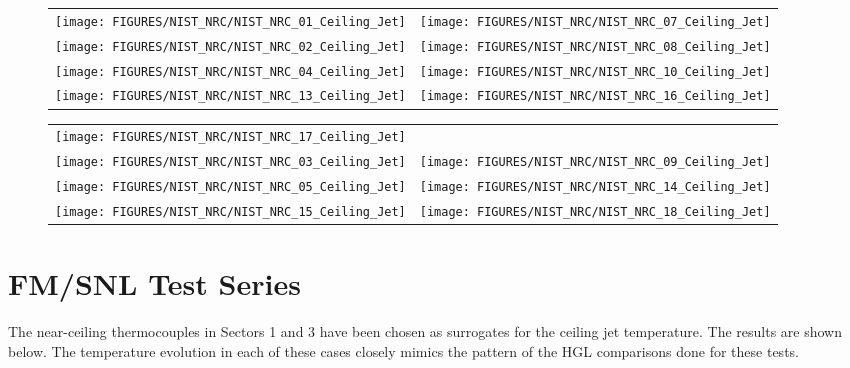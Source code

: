 \begin{figure}[p]
\begin{tabular*}{\textwidth}{l@{\extracolsep{\fill}}r}
\texttt{[image: FIGURES/NIST\_NRC/NIST\_NRC\_01\_Ceiling\_Jet]} &
\texttt{[image: FIGURES/NIST\_NRC/NIST\_NRC\_07\_Ceiling\_Jet]} \\
\texttt{[image: FIGURES/NIST\_NRC/NIST\_NRC\_02\_Ceiling\_Jet]} &
\texttt{[image: FIGURES/NIST\_NRC/NIST\_NRC\_08\_Ceiling\_Jet]} \\
\texttt{[image: FIGURES/NIST\_NRC/NIST\_NRC\_04\_Ceiling\_Jet]} &
\texttt{[image: FIGURES/NIST\_NRC/NIST\_NRC\_10\_Ceiling\_Jet]} \\
\texttt{[image: FIGURES/NIST\_NRC/NIST\_NRC\_13\_Ceiling\_Jet]} &
\texttt{[image: FIGURES/NIST\_NRC/NIST\_NRC\_16\_Ceiling\_Jet]}
\end{tabular*}
\label{NIST_NRC_Jet_Closed}
\end{figure}

\begin{figure}[p]
\begin{tabular*}{\textwidth}{l@{\extracolsep{\fill}}r}
\texttt{[image: FIGURES/NIST\_NRC/NIST\_NRC\_17\_Ceiling\_Jet]} &
 \\
\texttt{[image: FIGURES/NIST\_NRC/NIST\_NRC\_03\_Ceiling\_Jet]} &
\texttt{[image: FIGURES/NIST\_NRC/NIST\_NRC\_09\_Ceiling\_Jet]} \\
\texttt{[image: FIGURES/NIST\_NRC/NIST\_NRC\_05\_Ceiling\_Jet]} &
\texttt{[image: FIGURES/NIST\_NRC/NIST\_NRC\_14\_Ceiling\_Jet]} \\
\texttt{[image: FIGURES/NIST\_NRC/NIST\_NRC\_15\_Ceiling\_Jet]} &
\texttt{[image: FIGURES/NIST\_NRC/NIST\_NRC\_18\_Ceiling\_Jet]}
\end{tabular*}
\label{NIST_NRC_Jet_Open}
\end{figure}



\clearpage

\section{FM/SNL Test Series}

The near-ceiling thermocouples in Sectors 1 and 3 have been chosen as surrogates for the ceiling jet temperature.
The results are shown below. The temperature evolution in each of these cases closely mimics the pattern of the HGL comparisons done for these tests.


